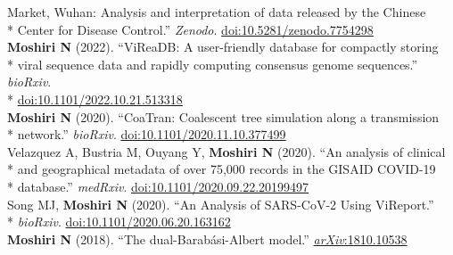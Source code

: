 \documentclass[margin,line]{res}
\begin{document}
\begin{resume}
\hspace*{9.5mm} Market, Wuhan: Analysis and interpretation of data released by the Chinese\\*\vspace{2mm}
\hspace*{8mm} Center for Disease Control.'' \textit{Zenodo}. \href{https://doi.org/10.5281/zenodo.7754298}{doi:10.5281/zenodo.7754298}\\
\hspace*{4mm} \textbf{Moshiri N} (2022). ``ViReaDB: A user-friendly database for compactly storing\\*
\hspace*{9.5mm} viral sequence data and rapidly computing consensus genome sequences.'' \textit{bioRxiv}.\\*\vspace{2mm}
\hspace*{8mm} \href{https://doi.org/10.1101/2022.10.21.513318}{doi:10.1101/2022.10.21.513318}\\
\hspace*{4mm} \textbf{Moshiri N} (2020). ``CoaTran: Coalescent tree simulation along a transmission\\*\vspace{2mm}
\hspace*{8mm} network.'' \textit{bioRxiv}. \href{https://doi.org/10.1101/2020.11.10.377499}{doi:10.1101/2020.11.10.377499}\\
\hspace*{4mm} Velazquez A, Bustria M, Ouyang Y, \textbf{Moshiri N} (2020). ``An analysis of clinical\\*
\hspace*{9.5mm} and geographical metadata of over 75,000 records in the GISAID COVID-19\\*\vspace{2mm}
\hspace*{8mm} database.'' \textit{medRxiv}. \href{https://doi.org/10.1101/2020.09.22.20199497}{doi:10.1101/2020.09.22.20199497}\\
\hspace*{4mm} Song MJ, \textbf{Moshiri N} (2020). ``An Analysis of SARS-CoV-2 Using ViReport.''\\*\vspace{2mm}
\hspace*{8mm} \textit{bioRxiv}. \href{https://doi.org/10.1101/2020.06.20.163162}{doi:10.1101/2020.06.20.163162}\\
\hspace*{4mm} \vspace{2mm}\textbf{Moshiri N} (2018). ``The dual-Barab\'asi-Albert model.'' \href{https://arxiv.org/abs/1810.10538}{\textit{arXiv}:1810.10538}\\

\end{resume}
\end{document}
